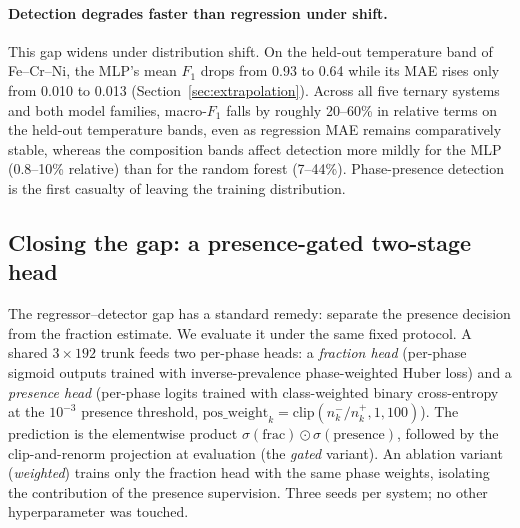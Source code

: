\documentclass[preprint,12pt,authoryear]{elsarticle}
\begin{document}
\paragraph{Detection degrades faster than regression under shift.}
This gap widens under distribution shift. On the held-out temperature band of
Fe--Cr--Ni, the MLP's mean $F_1$ drops from 0.93 to 0.64 while its MAE rises
only from 0.010 to 0.013 (Section~\ref{sec:extrapolation}). Across all five
ternary systems and both model families, macro-$F_1$ falls by roughly 20--60\% in
relative terms on the held-out temperature bands, even as regression MAE
remains comparatively stable, whereas the composition bands affect
detection more mildly for the MLP (0.8--10\% relative) than for the random
forest (7--44\%). Phase-presence
detection is the first casualty of leaving the training distribution.

\subsection{Closing the gap: a presence-gated two-stage head}
\label{sec:remedy}

The regressor--detector gap has a standard remedy: separate the
presence decision from the fraction estimate. We evaluate it under the
same fixed protocol. A shared $3\times192$ trunk feeds two per-phase
heads: a \emph{fraction head} (per-phase sigmoid outputs trained with
inverse-prevalence phase-weighted Huber loss) and a \emph{presence head}
(per-phase logits trained with class-weighted binary cross-entropy at the
$10^{-3}$ presence threshold, $\mathrm{pos\_weight}_k =
\mathrm{clip}(n^{-}_k/n^{+}_k, 1, 100)$). The prediction is the
elementwise product $\sigma(\mathrm{frac}) \odot
\sigma(\mathrm{presence})$, followed by the clip-and-renorm projection at
evaluation (the \emph{gated} variant). An ablation variant
(\emph{weighted}) trains only the fraction head with the same phase
weights, isolating the contribution of the presence supervision. Three
seeds per system; no other hyperparameter was touched.

\begin{table}[htbp]
\centering
\caption{Presence-gated remedy. Macro-AUPRC (mean over three seeds;
zero-positive phases excluded) for the renorm MLP, the three tree/$k$-NN
baselines, the phase-weighted ablation, and the gated two-stage head; the
final column is the gated-head test MAE relative to the renorm MLP
($<1$ means the gated head also improves regression). Best AUPRC per row in
bold.}
\label{tab:remedy}
\small

\end{table}
\end{document}
